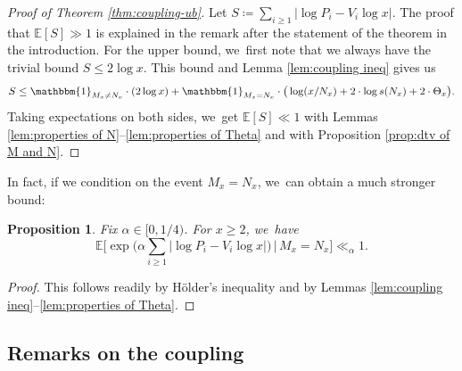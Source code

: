 \documentclass[10pt,a4paper]{amsart}
\newcommand{\EE}{\mathbb{E}}
\newcommand{\one}{\mathbbm{1}}
\newcommand{\bg}{\big}
\newcommand{\bgg}{\Big}
\theoremstyle{plain}
\newtheorem{prop}[cor]{Proposition}
\theoremstyle{definition}
\providecommand{\Subsection}{\subsection}
\begin{document}
\begin{proof}[Proof of Theorem \ref{thm:coupling-ub}]
Let $S \coloneqq \sum_{i \ge 1} |{\log P_i - V_i\log x}|$. The proof that $\EE[S] \gg 1$ is explained in the remark after the statement of the theorem in the introduction. For the upper bound, we~first note that we always have the trivial bound $S \le 2 \log x$. This bound and Lemma \ref{lem:coupling ineq} gives us
\[
S \le \one_{M_x \ne N_x}\cdot (2\log x) + \one_{M_x = N_x}\cdot \bg(\log(x/N_x) + 2\cdot \log s(N_x) + 2\cdot \Theta_x\bg).
\]
Taking expectations on both sides, we~get $\EE[S] \ll 1$ with Lemmas \ref{lem:properties of N}--\ref{lem:properties of Theta} and with Proposition \ref{prop:dtv of M and N}.
\end{proof}

In fact, if we condition on the event $M_x = N_x$, we~can obtain a much stronger bound:

\begin{prop}\label{thm:coupling-ub strong}
Fix $\alpha\in[0,1/4)$. For $x\ge2$, we~have
\[\textstyle
\EE\bgg[\exp\bg(\alpha \sum_{i \ge 1} |\log P_i - V_i \log x|\bg) \,\bg|\, M_x = N_x \bgg] \ll_{\alpha} 1.
\]
\end{prop}

\begin{proof}
This follows readily by Hölder's inequality and by Lemmas \ref{lem:coupling ineq}--\ref{lem:properties of Theta}.
\end{proof}

\Subsection{Remarks on the coupling}\label{sec:coupling:remarks}
\end{document}
